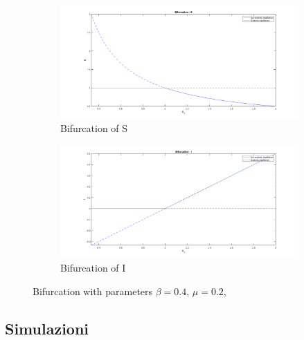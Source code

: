 \begin{figure}[h!]
    \label{fig:bifurcation}
    \begin{subfigure}{.5\textwidth}
        \centering
        \includegraphics[width=\linewidth]{Figure/bifurcation_s.png}  
        \caption{Bifurcation of S}
        \label{fig:bifurcation_s}
    \end{subfigure}
    \begin{subfigure}{.5\textwidth}
        \centering
        \includegraphics[width=\linewidth]{Figure/bifurcation_i.png}  
        \caption{Bifurcation of I}
        \label{fig:bifurcation_i}
    \end{subfigure}
    \caption{Bifurcation with parameters $\beta = 0.4$, $\mu = 0.2$,}
\end{figure}

\break


\subsection{Simulazioni}
\blindtext